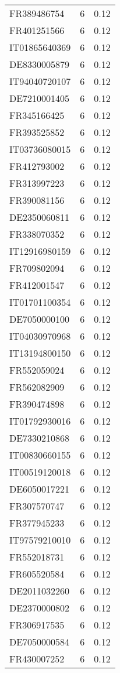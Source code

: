 \begin{table*}[htbp]
\begin{tabular}{lrr}
FR389486754 & 6 & 0.12 \\
FR401251566 & 6 & 0.12 \\
IT01865640369 & 6 & 0.12 \\
DE8330005879 & 6 & 0.12 \\
IT94040720107 & 6 & 0.12 \\
DE7210001405 & 6 & 0.12 \\
FR345166425 & 6 & 0.12 \\
FR393525852 & 6 & 0.12 \\
IT03736080015 & 6 & 0.12 \\
FR412793002 & 6 & 0.12 \\
FR313997223 & 6 & 0.12 \\
FR390081156 & 6 & 0.12 \\
DE2350060811 & 6 & 0.12 \\
FR338070352 & 6 & 0.12 \\
IT12916980159 & 6 & 0.12 \\
FR709802094 & 6 & 0.12 \\
FR412001547 & 6 & 0.12 \\
IT01701100354 & 6 & 0.12 \\
DE7050000100 & 6 & 0.12 \\
IT04030970968 & 6 & 0.12 \\
IT13194800150 & 6 & 0.12 \\
FR552059024 & 6 & 0.12 \\
FR562082909 & 6 & 0.12 \\
FR390474898 & 6 & 0.12 \\
IT01792930016 & 6 & 0.12 \\
DE7330210868 & 6 & 0.12 \\
IT00830660155 & 6 & 0.12 \\
IT00519120018 & 6 & 0.12 \\
DE6050017221 & 6 & 0.12 \\
FR307570747 & 6 & 0.12 \\
FR377945233 & 6 & 0.12 \\
IT97579210010 & 6 & 0.12 \\
FR552018731 & 6 & 0.12 \\
FR605520584 & 6 & 0.12 \\
DE2011032260 & 6 & 0.12 \\
DE2370000802 & 6 & 0.12 \\
FR306917535 & 6 & 0.12 \\
DE7050000584 & 6 & 0.12 \\
FR430007252 & 6 & 0.12 \\

\end{tabular}
\end{table*}
